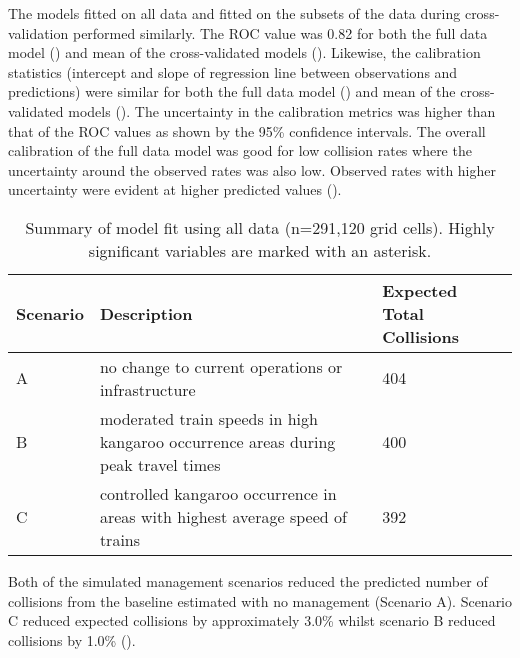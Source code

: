 The models fitted on all data and fitted on the subsets of the data during cross-validation performed similarly.  The ROC value was 0.82 for both the full data model () and mean of the cross-validated models ().  Likewise, the calibration statistics (intercept and slope of regression line between observations and predictions) were similar for both the full data model () and mean of the cross-validated models ().  The uncertainty in the calibration metrics was higher than that of the ROC values as shown by the 95\% confidence intervals.  The overall calibration of the full data model was good for low collision rates where the uncertainty around the observed rates was also low. Observed rates with higher uncertainty were evident at higher predicted values ().

\begin{table}[htp]
\caption{Summary of model fit using all data (n=291,120 grid cells).  Highly significant variables are marked with an asterisk.}
\begin{tabularx}{\textwidth}{lll} \toprule
Scenario	&Description	&Expected Total Collisions \\ \midrule 
A			&no change to current operations or infrastructure			&404 \\ 
B			&moderated train speeds in high kangaroo occurrence areas during peak travel times			&400 \\ 
C			&controlled kangaroo occurrence in areas with highest average speed of trains			&392 \\ 
\bottomrule
\end{tabularx}
\label{train_manage}
\end{table}

Both of the simulated management scenarios reduced the predicted number of collisions from the baseline estimated with no management (Scenario A).  Scenario C reduced expected collisions by approximately 3.0\% whilst scenario B reduced collisions by 1.0\% ().

